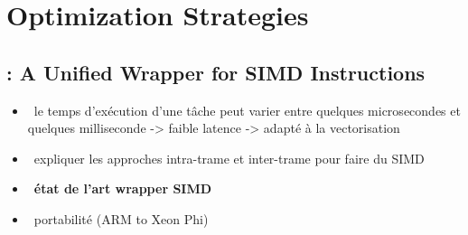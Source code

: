 \graphicspath{{main/chapter3/fig/}}

\chapter{Optimization Strategies}

\minitoccustom





\section{\longMIPP: A Unified Wrapper for SIMD Instructions}

\begin{itemize}
  \item \xmark~le temps d'exécution d'une tâche peut varier entre quelques
    microsecondes et quelques milliseconde -> faible latence -> adapté à la
    vectorisation
  \item \xmark~expliquer les approches intra-trame et inter-trame pour faire du
    SIMD
  \item \cmark~\textbf{état de l'art wrapper SIMD}
  \item \cmark~portabilité (ARM to Xeon Phi)
\end{itemize}

